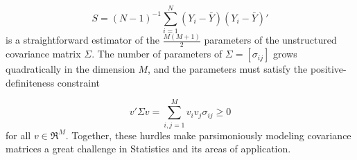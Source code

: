 \documentclass[12pt]{article}
\theoremstyle{definition}
\begin{document}
\begin{equation} \label{eq:sample-covariance-matrix}
S = \left(N-1\right)^{-1} \sum_{i = 1}^N \left(Y_i - \bar{Y}\right)\left(Y_i - \bar{Y}\right)'
\end{equation}
\noindent
is a straightforward estimator of the $\frac{M\left(M+1\right)}{2}$ parameters of the unstructured covariance matrix $\Sigma$. The number of parameters of $\Sigma = \left[ \sigma_{ij} \right]$ grows quadratically in the dimension $M$, and the parameters must satisfy the positive-definiteness constraint

\begin{equation} \label{eq:positive-definite-constraint} 
v'\Sigma v = \sum_{i,j = 1}^M v_i v_j \sigma_{ij} \ge 0 
\end{equation}
\noindent
for all $v \in \Re^M$. Together, these hurdles make parsimoniously modeling covariance matrices a great challenge in Statistics and its areas of application.

\bigskip





\end{document}
